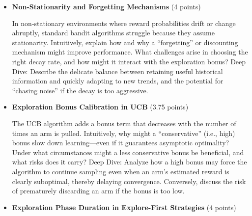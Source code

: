 \documentclass[12pt]{article}
\begin{document}
{{{\begin{itemize}[noitemsep]
    \vspace{0.25cm}
    Imagine designing a hybrid bandit agent that can switch between an explore‑first strategy and UCB based on observed performance. What signals (e.g., variance of reward estimates, stabilization of Q‑values, or sudden drops in reward) might indicate that a switch is warranted? Provide an intuitive justification for how and why such a meta‑strategy might outperform either strategy alone in a finite‑time setting.
    Deep Dive:
    Explain the challenges in detecting when exploration is “enough” and how early exploitation might capture transient improvements even if the long‑term guarantee favors UCB.
    \vspace{0.5cm}
    \item \textbf{Non-Stationarity and Forgetting Mechanisms} (4 points)

    \vspace{0.25cm}
    In non‑stationary environments where reward probabilities drift or change abruptly, standard bandit algorithms struggle because they assume stationarity. Intuitively, explain how and why a “forgetting” or discounting mechanism might improve performance. What challenges arise in choosing the right decay rate, and how might it interact with the exploration bonus?
    Deep Dive:
    Describe the delicate balance between retaining useful historical information and quickly adapting to new trends, and the potential for “chasing noise” if the decay is too aggressive.
    \vspace{0.5cm}
    \item \textbf{Exploration Bonus Calibration in UCB} (3.75 points)

    \vspace{0.25cm}
    The UCB algorithm adds a bonus term that decreases with the number of times an arm is pulled. Intuitively, why might a “conservative” (i.e., high) bonus slow down learning—even if it guarantees asymptotic optimality? Under what circumstances might a less conservative bonus be beneficial, and what risks does it carry?
    Deep Dive:
    Analyze how a high bonus may force the algorithm to continue sampling even when an arm’s estimated reward is clearly suboptimal, thereby delaying convergence. Conversely, discuss the risk of prematurely discarding an arm if the bonus is too low.
    \vspace{0.5cm}
    \item \textbf{Exploration Phase Duration in Explore-First Strategies} (4 points)
    

\end{itemize}}}}
\end{document}
